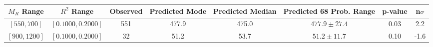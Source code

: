 \documentclass[12pt]{article}
\begin{document}
\begin{table}[!ht]
\begin{tiny}
\begin{center}
\begin{tabular}{|c|c|c|c|c|c|c|c|}
\hline
$M_R$ Range & $R^2$ Range & Observed & Predicted Mode & Predicted Median & Predicted 68 Prob. Range & p-value & n$\sigma$ \\
\hline
$[ 550, 700]$ & $[0.1000,0.2000]$ & 551 & 477.9 & 475.0 & $477.9 \pm 27.4$ & 0.03 &  2.2 \\ 
$[ 900,1200]$ & $[0.1000,0.2000]$ & 32 & 51.2 & 53.7 & $51.2 \pm 11.7$ & 0.10 & -1.6 \\ 
\hline
\end{tabular}
\end{center}
\end{tiny}
\end{table}
\end{document}
